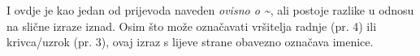 	\begin{reibun}
	\end{reibun}

	I ovdje je kao jedan od prijevoda naveden \textit{ovisno o \textasciitilde}, ali postoje razlike u odnosu na slične izraze iznad. Osim što može označavati vršitelja radnje (pr. 4) ili krivca/uzrok (pr. 3), ovaj izraz s lijeve strane obavezno označava imenice.
	
